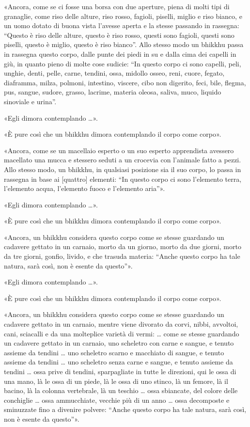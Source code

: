 «Ancora, come se ci fosse una borsa con due aperture, piena di molti tipi di
granaglie, come riso delle alture, riso rosso, fagioli, piselli, miglio e riso
bianco, e un uomo dotato di buona vista l’avesse aperta e la stesse passando in
rassegna: “Questo è riso delle alture, questo è riso rosso, questi sono fagioli,
questi sono piselli, questo è miglio, questo è riso bianco”. Allo stesso modo un
bhikkhu passa in rassegna questo corpo, dalle punte dei piedi in su e dalla cima
dei capelli in giù, in quanto pieno di molte cose sudicie: “In questo corpo ci
sono capelli, peli, unghie, denti, pelle, carne, tendini, ossa, midollo osseo,
reni, cuore, fegato, diaframma, milza, polmoni, intestino, viscere, cibo non
digerito, feci, bile, flegma, pus, sangue, sudore, grasso, lacrime, materia
oleosa, saliva, muco, liquido sinoviale e urina”.

«Egli dimora contemplando …».

«È pure così che un bhikkhu dimora contemplando il corpo come corpo».

«Ancora, come se un macellaio esperto o un suo esperto apprendista avessero
macellato una mucca e stessero seduti a un crocevia con l’animale fatto a pezzi.
Allo stesso modo, un bhikkhu, in qualsiasi posizione sia il suo corpo, lo passa
in rassegna in base ai [quattro] elementi: “In questo corpo ci sono l’elemento
terra, l’elemento acqua, l’elemento fuoco e l’elemento aria”».

«Egli dimora contemplando …».

«È pure così che un bhikkhu dimora contemplando il corpo come corpo».

\label{pag270}%
«Ancora, un bhikkhu considera questo corpo come se stesse guardando un cadavere
gettato in un carnaio, morto da un giorno, morto da due giorni, morto da tre
giorni, gonfio, livido, e che trasuda materia: “Anche questo corpo ha tale
natura, sarà così, non è esente da questo”».

«Egli dimora contemplando …».

«È pure così che un bhikkhu dimora contemplando il corpo come corpo».

«Ancora, un bhikkhu considera questo corpo come se stesse guardando un cadavere
gettato in un carnaio, mentre viene divorato da corvi, nibbi, avvoltoi, cani,
sciacalli e da una molteplice varietà di vermi: … come se stesse guardando un
cadavere gettato in un carnaio, uno scheletro con carne e sangue, e tenuto
assieme da tendini … uno scheletro scarno e macchiato di sangue, e tenuto
assieme da tendini … uno scheletro senza carne e sangue, e tenuto assieme da
tendini … ossa prive di tendini, sparpagliate in tutte le direzioni, qui le ossa
di una mano, là le ossa di un piede, là le ossa di uno stinco, là un femore, là
il bacino, là la colonna vertebrale, là un teschio … ossa sbiancate, del colore
delle conchiglie … ossa ammucchiate, vecchie più di un anno … ossa decomposte e
sminuzzate fino a divenire polvere: “Anche questo corpo ha tale natura, sarà
così, non è esente da questo”».

